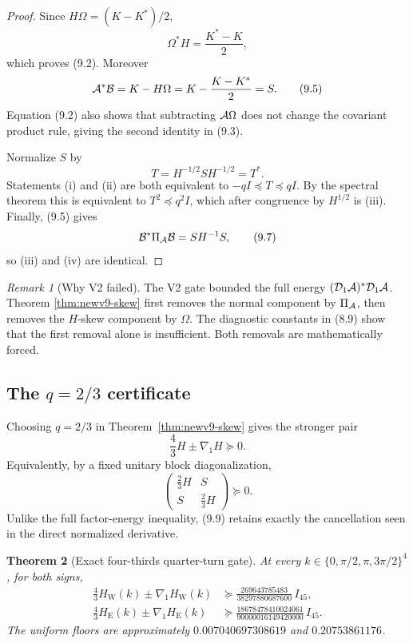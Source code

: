 \documentclass[11pt,oneside]{article}
\newtheorem{theorem}{Theorem}[section]
\theoremstyle{definition}
\theoremstyle{remark}
\newtheorem{remark}[theorem]{Remark}
\begin{document}
\begin{proof}
Since \(H\Omega=(K-K^*)/2\),
\[
 \Omega^*H=\frac{K^*-K}{2},
\]
which proves (9.2).  Moreover
\[
 {\cal A}^*{\cal B}=K-H\Omega
 =K-\frac{K-K^*}{2}=S.                                   \tag{9.5}
\]
Equation (9.2) also shows that subtracting
\({\cal A}\Omega\) does not change the covariant product rule, giving
the second identity in (9.3).

Normalize \(S\) by
\[
 T=H^{-1/2}SH^{-1/2}=T^*.                                \tag{9.6}
\]
Statements (i) and (ii) are both equivalent to
\(-qI\preceq T\preceq qI\).  By the spectral theorem this is
equivalent to \(T^2\preceq q^2I\), which after congruence by
\(H^{1/2}\) is (iii).  Finally, (9.5) gives
\[
 {\cal B}^*\Pi_{\cal A}{\cal B}
 =S H^{-1}S,                                              \tag{9.7}
\]
so (iii) and (iv) are identical.
\end{proof}

\begin{remark}[Why V2 failed]
\label{rem:newv9-v2}
The V2 gate bounded the full energy
\(({\cal D}_1{\cal A})^*{\cal D}_1{\cal A}\).  Theorem
\ref{thm:newv9-skew} first removes the normal component by
\(\Pi_{\cal A}\), then removes the \(H\)-skew component by
\(\Omega\).  The diagnostic constants in (8.9) show that the first
removal alone is insufficient.  Both removals are mathematically
forced.
\end{remark}

\subsection{The \(q=2/3\) certificate}

Choosing \(q=2/3\) in Theorem~\ref{thm:newv9-skew} gives the stronger
pair
\[
 \frac43H\pm\nabla_1H\succeq0.                            \tag{9.8}
\]
Equivalently, by a fixed unitary block diagonalization,
\[
 \begin{pmatrix}
 \frac23H&S\\S&\frac23H
 \end{pmatrix}\succeq0.                                  \tag{9.9}
\]
Unlike the full factor-energy inequality, (9.9) retains exactly the
cancellation seen in the direct normalized derivative.

\begin{theorem}[Exact four-thirds quarter-turn gate]
\label{thm:newv9-four-thirds}
At every \(k\in\{0,\pi/2,\pi,3\pi/2\}^4\), for both signs,
\[
\begin{aligned}
 \frac43H_{\mathrm W}(k)\pm\nabla_1H_{\mathrm W}(k)
 &\succeq
 \frac{269643785483}{38297880687600}\,I_{45},\\
 \frac43H_{\mathrm E}(k)\pm\nabla_1H_{\mathrm E}(k)
 &\succeq
 \frac{18678478410024061}{90000016149420000}\,I_{45}.
\end{aligned}
\tag{9.10}
\]
The uniform floors are approximately \(0.007040697308619\) and
\(0.20753861176\).
\end{theorem}
\end{document}

